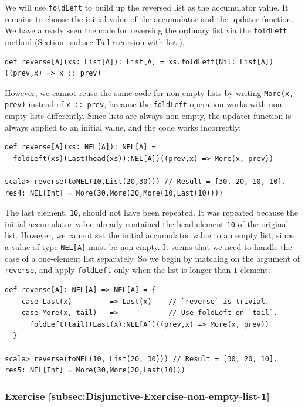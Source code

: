 We will use \lstinline!foldLeft! to build up the reversed list as
the accumulator value. It remains to choose the initial value of the
accumulator and the updater function. We have already seen the code
for reversing the ordinary list via the \lstinline!foldLeft! method
(Section~\ref{subsec:Tail-recursion-with-list}),
\begin{lstlisting}
def reverse[A](xs: List[A]): List[A] = xs.foldLeft(Nil: List[A])((prev,x) => x :: prev)
\end{lstlisting}
However, we cannot reuse the same code for non-empty lists by writing
\lstinline!More(x, prev)! instead of \lstinline!x :: prev!, because
the \lstinline!foldLeft! operation works with non-empty lists differently.
Since lists are always non-empty, the updater function is always applied
to an initial value, and the code works incorrectly:
\begin{lstlisting}
def reverse[A](xs: NEL[A]): NEL[A] =
  foldLeft(xs)(Last(head(xs)):NEL[A])((prev,x) => More(x, prev))

scala> reverse(toNEL(10,List(20,30))) // Result = [30, 20, 10, 10].
res4: NEL[Int] = More(30,More(20,More(10,Last(10))))
\end{lstlisting}
The last element, \lstinline!10!, should not have been repeated.
It was repeated because the initial accumulator value already contained
the head element \lstinline!10! of the original list. However, we
cannot set the initial accumulator value to an empty list, since a
value of type \lstinline!NEL[A]! must be non-empty. It seems that
we need to handle the case of a one-element list separately. So we
begin by matching on the argument of \lstinline!reverse!, and apply
\lstinline!foldLeft! only when the list is longer than $1$ element:
\begin{lstlisting}
def reverse[A]: NEL[A] => NEL[A] = {
    case Last(x)         => Last(x)    // `reverse` is trivial.
    case More(x, tail)   =>            // Use foldLeft on `tail`.
      foldLeft(tail)(Last(x):NEL[A])((prev,x) => More(x, prev))
  }

scala> reverse(toNEL(10, List(20, 30))) // Result = [30, 20, 10].
res5: NEL[Int] = More(30,More(20,Last(10)))
\end{lstlisting}


\subsubsection{Exercise \label{subsec:Disjunctive-Exercise-non-empty-list-1}\ref{subsec:Disjunctive-Exercise-non-empty-list-1}}

